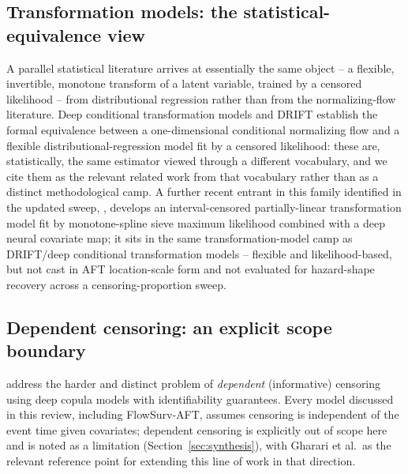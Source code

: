\documentclass[11pt]{article}
\begin{document}
\subsection{Transformation models: the statistical-equivalence view}
A parallel statistical literature arrives at essentially the same object
-- a flexible, invertible, monotone transform of a latent variable,
trained by a censored likelihood -- from distributional regression rather
than from the normalizing-flow literature. Deep conditional
transformation models \citep{baumann2021transformation} and DRIFT
\citep{kolb2024drift} establish the formal equivalence between a
one-dimensional conditional normalizing flow and a flexible
distributional-regression model fit by a censored likelihood: these are,
statistically, the same estimator viewed through a different vocabulary,
and we cite them as the relevant related work from that vocabulary rather
than as a distinct methodological camp. A further recent entrant in this
family identified in the updated sweep, \citet{yuan2025transformation},
develops an interval-censored partially-linear transformation model fit
by monotone-spline sieve maximum likelihood combined with a deep neural
covariate map; it sits in the same transformation-model camp as
DRIFT/deep conditional transformation models -- flexible and
likelihood-based, but not cast in AFT location-scale form and not
evaluated for hazard-shape recovery across a censoring-proportion sweep.

\subsection{Dependent censoring: an explicit scope boundary}
\citet{gharari2023copula} address the harder and distinct problem of
\emph{dependent} (informative) censoring using deep copula models with
identifiability guarantees. Every model discussed in this review,
including FlowSurv-AFT, assumes censoring is independent of the event
time given covariates; dependent censoring is explicitly out of scope
here and is noted as a limitation (Section~\ref{sec:synthesis}), with
Gharari et al.\ as the relevant reference point for extending this line
of work in that direction.
\end{document}
